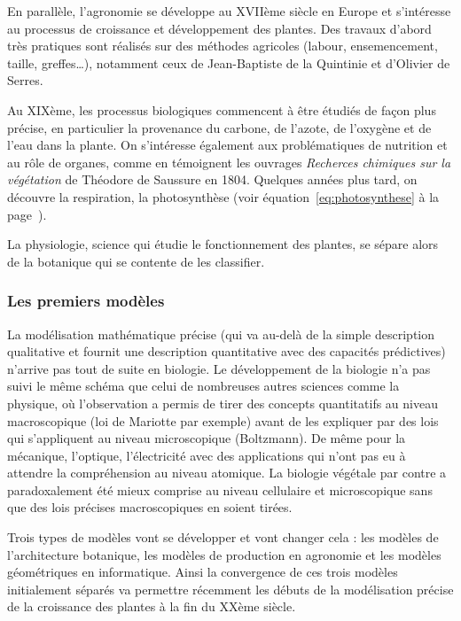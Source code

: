 En parallèle, l’agronomie se développe au XVIIème siècle en Europe
et s’intéresse au processus de croissance et développement des plantes.
Des travaux d’abord très pratiques sont réalisés sur des méthodes agricoles 
(labour, ensemencement, taille, greffes…), notamment ceux de
Jean-Baptiste de la Quintinie et d'Olivier de Serres.

Au XIXème, les processus biologiques commencent à être étudiés de façon plus
précise, en particulier la provenance du carbone, de l’azote,
de l’oxygène et de l’eau dans la plante.
On s'intéresse également aux problématiques de nutrition et
au rôle de organes, comme en témoignent les ouvrages
\emph{Recherces chimiques sur la végétation} de Théodore de Saussure en 1804.
Quelques années plus tard, on découvre la respiration, la photosynthèse
(voir équation~\ref{eq:photosynthese} à la 
page~\pageref{subsubsec:photosynthese}).

La physiologie, science qui étudie le fonctionnement des plantes,
se sépare alors de la botanique qui se contente de les classifier.

\subsubsection{Les premiers modèles}

La modélisation mathématique précise (qui va au-delà de la simple
description qualitative et fournit une description quantitative
avec des capacités prédictives) n’arrive pas tout de suite en biologie. 
Le développement de la biologie n’a pas suivi le même schéma que celui de
nombreuses autres sciences comme la physique, où l’observation a permis de
tirer des concepts quantitatifs au niveau macroscopique
(loi de Mariotte par exemple) avant de les expliquer par des lois qui s’appliquent au niveau microscopique (Boltzmann). De même pour la mécanique, l’optique, l’électricité avec des applications qui n’ont pas eu à attendre la compréhension au niveau atomique. La biologie végétale par contre a paradoxalement été mieux comprise au niveau cellulaire et microscopique sans que des lois précises macroscopiques en soient tirées.

Trois types de modèles vont se développer et vont changer cela : les modèles de l’architecture botanique, les modèles de production en agronomie et les modèles géométriques en informatique. Ainsi la convergence de ces trois modèles initialement séparés va permettre récemment les débuts de la modélisation précise de la croissance des plantes à la fin du XXème siècle.  

